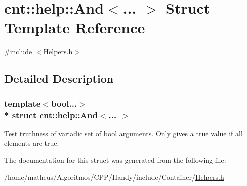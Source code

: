 \hypertarget{structcnt_1_1help_1_1And}{}\section{cnt\+:\+:help\+:\+:And$<$... $>$ Struct Template Reference}
\label{structcnt_1_1help_1_1And}


{\ttfamily \#include $<$Helpers.\+h$>$}



\subsection{Detailed Description}
\subsubsection*{template$<$bool...$>$\\*
struct cnt\+::help\+::\+And$<$... $>$}

Test truthness of variadic set of bool arguments. Only gives a true value if all elements are true. 

The documentation for this struct was generated from the following file\+:\begin{DoxyCompactItemize}
\item 
/home/matheus/\+Algoritmos/\+C\+P\+P/\+Handy/include/\+Container/\hyperlink{Container_2Helpers_8h}{Helpers.\+h}\end{DoxyCompactItemize}

